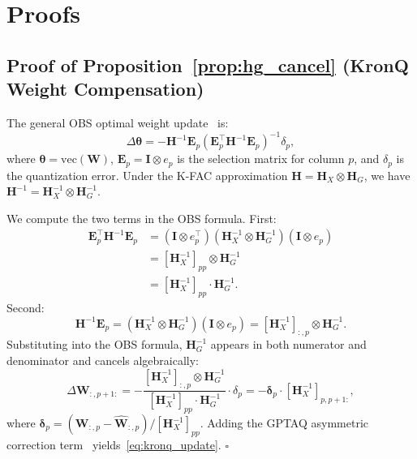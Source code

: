 \documentclass{article} %
\begin{document}
\section{Proofs}
\label{app:proofs}

\subsection{Proof of Proposition~\ref{prop:hg_cancel} (KronQ Weight Compensation)}
\label{proof_prop1}

The general OBS optimal weight update~\citep{hassibi1992second} is:
\begin{equation}
    \Delta\boldsymbol{\theta} = -\mathbf{H}^{-1}\mathbf{E}_p(\mathbf{E}_p^\top\mathbf{H}^{-1}\mathbf{E}_p)^{-1}\delta_p,
\end{equation}
where $\boldsymbol{\theta} = \mathrm{vec}(\mathbf{W})$, $\mathbf{E}_p = \mathbf{I} \otimes e_p$ is the selection matrix for column $p$, and $\delta_p$ is the quantization error. Under the K-FAC approximation $\mathbf{H} = \mathbf{H}_X \otimes \mathbf{H}_G$, we have $\mathbf{H}^{-1} = \mathbf{H}_X^{-1} \otimes \mathbf{H}_G^{-1}$.

We compute the two terms in the OBS formula. First:
\begin{align}
    \mathbf{E}_p^\top \mathbf{H}^{-1} \mathbf{E}_p
    &= (\mathbf{I} \otimes e_p^\top)(\mathbf{H}_X^{-1} \otimes \mathbf{H}_G^{-1})(\mathbf{I} \otimes e_p) \nonumber \\
    &= [\mathbf{H}_X^{-1}]_{pp} \nonumber \otimes \mathbf{H}_G^{-1} \\
    &= [\mathbf{H}_X^{-1}]_{pp} \cdot \mathbf{H}_G^{-1}.
\end{align}
Second:
\begin{equation}
    \mathbf{H}^{-1}\mathbf{E}_p = (\mathbf{H}_X^{-1} \otimes \mathbf{H}_G^{-1})(\mathbf{I} \otimes e_p)
    = [\mathbf{H}_X^{-1}]_{:,p} \otimes \mathbf{H}_G^{-1}.
\end{equation}
Substituting into the OBS formula, $\mathbf{H}_G^{-1}$ appears in both numerator and denominator and cancels algebraically:
\begin{equation}
    \Delta\mathbf{W}_{:,p+1:}
    = -\frac{[\mathbf{H}_X^{-1}]_{:,p} \otimes \mathbf{H}_G^{-1}}{[\mathbf{H}_X^{-1}]_{pp} \cdot \mathbf{H}_G^{-1}}
    \cdot \delta_p
    = -\boldsymbol{\delta}_p \cdot [\mathbf{H}_X^{-1}]_{p,p+1:},
\end{equation}
where $\boldsymbol{\delta}_p = (\mathbf{W}_{:,p} - \widehat{\mathbf{W}}_{:,p})/[\mathbf{H}_X^{-1}]_{pp}$.
Adding the GPTAQ asymmetric correction term~\citep{li2025gptaq} yields~\eqref{eq:kronq_update}.
\hfill$\square$
\end{document}
